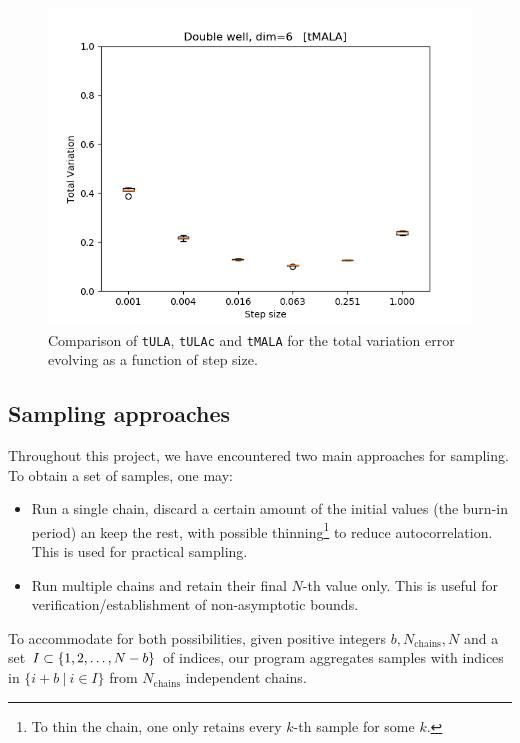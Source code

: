 \begin{figure}[H]
\begin{minipage}[b]{0.32\textwidth}
    \includegraphics[width=\textwidth]{Figures/tmala_tv.png}
  \end{minipage}
   \caption{Comparison of \texttt{tULA}, \texttt{tULAc} and \texttt{tMALA} for the total variation error evolving as a function of step size.}
\end{figure}




\subsection{Sampling approaches}

Throughout this project, we have encountered two main approaches for sampling. To obtain a set of samples, one may:

\begin{itemize}
    \item Run a single chain, discard a certain amount of the initial values (the burn-in period) an keep the rest, with possible thinning\footnote{To thin the chain, one only retains every $k$-th sample for some $k$.} to reduce autocorrelation. This is used for practical sampling.
    \item Run multiple chains and retain their final $N$-th value only. This is useful for verification/establishment of non-asymptotic bounds.
\end{itemize}

To accommodate for both possibilities, given positive integers $b, N_{\text{chains}}, N$ and a set $I \subset \mathbb \{1, 2, \dots, N - b\}$ of indices, our program aggregates samples with indices in $\{i+b\ |\ i \in I\} $  from $ N_{\text{chains}}$ independent chains.

